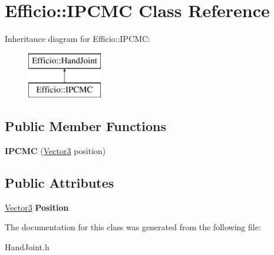 \hypertarget{class_efficio_1_1_i_p_c_m_c}{}\section{Efficio\+:\+:I\+P\+C\+MC Class Reference}
\label{class_efficio_1_1_i_p_c_m_c}
Inheritance diagram for Efficio\+:\+:I\+P\+C\+MC\+:\begin{figure}[H]
\begin{center}
\leavevmode
\includegraphics[height=2.000000cm]{class_efficio_1_1_i_p_c_m_c}
\end{center}
\end{figure}
\subsection*{Public Member Functions}
\begin{DoxyCompactItemize}
\item 
\hypertarget{class_efficio_1_1_i_p_c_m_c_ab4ad858afbf608d28032acf561643a4c}{}\label{class_efficio_1_1_i_p_c_m_c_ab4ad858afbf608d28032acf561643a4c} 
{\bfseries I\+P\+C\+MC} (\hyperlink{class_efficio_1_1_vector3}{Vector3} position)
\end{DoxyCompactItemize}
\subsection*{Public Attributes}
\begin{DoxyCompactItemize}
\item 
\hypertarget{class_efficio_1_1_i_p_c_m_c_a6963fba7ee73bcf5363a85b4ad6d2dbd}{}\label{class_efficio_1_1_i_p_c_m_c_a6963fba7ee73bcf5363a85b4ad6d2dbd} 
\hyperlink{class_efficio_1_1_vector3}{Vector3} {\bfseries Position}
\end{DoxyCompactItemize}


The documentation for this class was generated from the following file\+:\begin{DoxyCompactItemize}
\item 
Hand\+Joint.\+h\end{DoxyCompactItemize}
